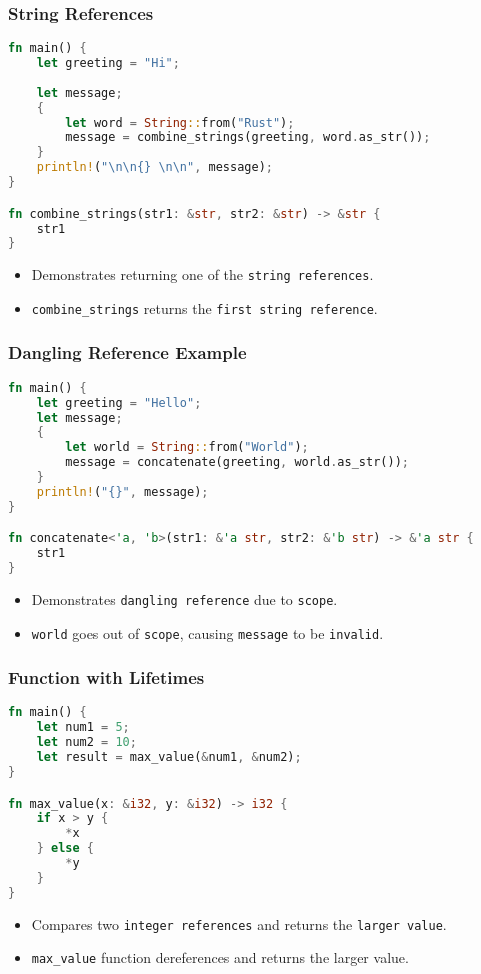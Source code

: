 \documentclass[aspectratio=169, table]{beamer}
\begin{document}
\begin{frame}[fragile]
\frametitle{String References}
\begin{lstlisting}[language=Rust]
fn main() {
	let greeting = "Hi";
	
	let message;
	{
		let word = String::from("Rust");
		message = combine_strings(greeting, word.as_str());
	}
	println!("\n\n{} \n\n", message);
}

fn combine_strings(str1: &str, str2: &str) -> &str {
	str1
}
\end{lstlisting}
\begin{itemize}
\item Demonstrates returning one of the \texttt{string references}.
\item \texttt{combine\_strings} returns the \texttt{first string reference}.
\end{itemize}
\end{frame}

\begin{frame}[fragile]
\frametitle{Dangling Reference Example}
\begin{lstlisting}[language=Rust]
fn main() {
	let greeting = "Hello";
	let message;
	{
		let world = String::from("World");
		message = concatenate(greeting, world.as_str());
	}
	println!("{}", message);
}

fn concatenate<'a, 'b>(str1: &'a str, str2: &'b str) -> &'a str {
	str1
}
\end{lstlisting}
\begin{itemize}
\item Demonstrates \texttt{dangling\ reference} due to \texttt{scope}.
\item \texttt{world} goes out of \texttt{scope}, causing \texttt{message} to be \texttt{invalid}.
\end{itemize}
\end{frame}

\begin{frame}[fragile]
\frametitle{Function with Lifetimes}
\begin{lstlisting}[language=Rust]
fn main() {
	let num1 = 5;
	let num2 = 10;
	let result = max_value(&num1, &num2);
}

fn max_value(x: &i32, y: &i32) -> i32 {
	if x > y {
		*x
	} else {
		*y
	}
}
\end{lstlisting}
\begin{itemize}
\item Compares two \texttt{integer\ references} and returns the \texttt{larger\ value}.
\item \texttt{max\_value} function dereferences and returns the larger value.
\end{itemize}
\end{frame}
\end{document}
